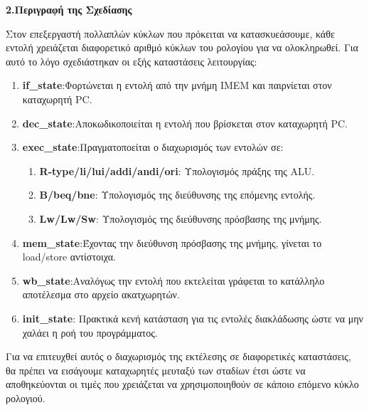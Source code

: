 { \large \bfseries 2.Περιγραφή της Σχεδίασης}\\ %

\begin{justify}
    Στον επεξεργαστή πολλαπλών κύκλων που πρόκειται να κατασκυεάσουμε,
    κάθε εντολή χρειάζεται διαφορετικό αριθμό κύκλων του
    ρολογίου για να ολοκληρωθεί. Για αυτό το λόγο σχεδιάστηκαν οι εξής
    καταστάσεις λειτουργίας:
\end{justify}
\begin{enumerate}
    \item {\bf\textlatin{if\_state}}:Φορτώνεται
    η εντολή από την μνήμη \textlatin{IMEM} και παιρνίεται στον καταχωρητή
    \textlatin{PC}.
    \item {\bf\textlatin{dec\_state}}:Αποκωδικοποιείται
    η εντολή που βρίσκεται στον καταχωρητή \textlatin{PC}.
    \item {\bf\textlatin{exec\_state}}:Πραγματοποείται
    ο διαχωρισμός των εντολών σε:
    \begin{enumerate}
        \item {\bf\textlatin{R-type/li/lui/addi/andi/ori}}: Υπολογισμός
        πράξης της \textlatin{ALU}.
        \item {\bf\textlatin{B/beq/bne}}: Υπολογισμός της διεύθυνσης
        της επόμενης εντολής.
        \item {\bf\textlatin{Lw/Lw/Sw}}: Υπολογισμός της διεύθυνσης
        πρόσβασης της μνήμης.
    \end{enumerate}
    \item {\bf\textlatin{mem\_state}}:Έχοντας
    την διεύθυνση πρόσβασης της μνήμης, γίνεται το \textlatin{load/store}
    αντίστοιχα.
    \item {\bf\textlatin{wb\_state}}:Αναλόγως
    την εντολή που εκτελείται γράφεται το κατάλληλο αποτέλεσμα στο αρχείο
    ακατχωρητών.
    \item {\bf\textlatin{init\_state}}: Πρακτικά κενή κατάσταση για τις εντολές
    διακλάδωσης ώστε να μην χαλάει η ροή του προγράμματος.
\end{enumerate}

\newpage

\begin{justify}
    Για να επιτευχθεί αυτός ο διαχωρισμός της εκτέλεσης
    σε διαφορετικές καταστάσεις, θα πρέπει να εισάγουμε καταχωρητές
    μευταξύ των σταδίων έτσι ώστε να αποθηκεύονται οι τιμές που
    χρειάζεται να χρησιμοποιηθούν σε κάποιο επόμενο κύκλο ρολογιού.
\end{justify}

